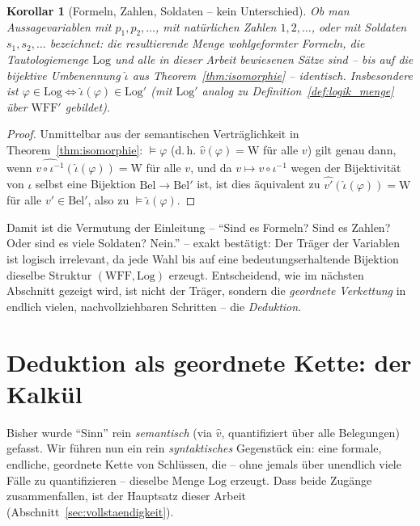 \documentclass[12pt, a4paper]{article}
\newtheorem{corollary}[theorem]{Korollar}
\theoremstyle{definition}
\theoremstyle{remark}
\newcommand{\W}{\mathrm{W}}
\newcommand{\WFF}{\mathrm{WFF}}
\newcommand{\Log}{\mathrm{Log}}
\newcommand{\Bel}{\mathrm{Bel}}
\begin{document}
\begin{corollary}[Formeln, Zahlen, Soldaten -- kein Unterschied]
\label{cor:soldaten_egal}
Ob man Aussagevariablen mit $p_1,p_2,\dots$, mit natürlichen Zahlen $1,2,\dots$, oder mit Soldaten $s_1,s_2,\dots$ bezeichnet: die resultierende Menge wohlgeformter Formeln, die Tautologiemenge $\Log$ und alle in dieser Arbeit bewiesenen Sätze sind -- bis auf die bijektive Umbenennung $\hat\iota$ aus Theorem~\ref{thm:isomorphie} -- identisch. Insbesondere ist $\varphi \in \Log \Leftrightarrow \hat\iota(\varphi) \in \Log'$ (mit $\Log'$ analog zu Definition~\ref{def:logik_menge} über $\WFF'$ gebildet).
\end{corollary}
\begin{proof}
Unmittelbar aus der semantischen Verträglichkeit in Theorem~\ref{thm:isomorphie}: $\models\varphi$ (d.\,h. $\hat v(\varphi)=\W$ für alle $v$) gilt genau dann, wenn $\widehat{v\circ\iota^{-1}}(\hat\iota(\varphi))=\W$ für alle $v$, und da $v \mapsto v\circ\iota^{-1}$ wegen der Bijektivität von $\iota$ selbst eine Bijektion $\Bel \to \Bel'$ ist, ist dies äquivalent zu $\widehat{v'}(\hat\iota(\varphi))=\W$ für alle $v'\in\Bel'$, also zu $\models \hat\iota(\varphi)$.
\end{proof}

Damit ist die Vermutung der Einleitung -- ``Sind es Formeln? Sind es Zahlen? Oder sind es viele Soldaten? Nein.'' -- exakt bestätigt: Der Träger der Variablen ist logisch irrelevant, da jede Wahl bis auf eine bedeutungserhaltende Bijektion dieselbe Struktur $(\WFF, \Log)$ erzeugt. Entscheidend, wie im nächsten Abschnitt gezeigt wird, ist nicht der Träger, sondern die \emph{geordnete Verkettung} in endlich vielen, nachvollziehbaren Schritten -- die \emph{Deduktion}.

\section{Deduktion als geordnete Kette: der Kalkül}
\label{sec:kalkuel}

Bisher wurde ``Sinn'' rein \emph{semantisch} (via $\hat v$, quantifiziert über alle Belegungen) gefasst. Wir führen nun ein rein \emph{syntaktisches} Gegenstück ein: eine formale, endliche, geordnete Kette von Schlüssen, die -- ohne jemals über unendlich viele Fälle zu quantifizieren -- dieselbe Menge $\Log$ erzeugt. Dass beide Zugänge zusammenfallen, ist der Hauptsatz dieser Arbeit (Abschnitt~\ref{sec:vollstaendigkeit}).
\end{document}
